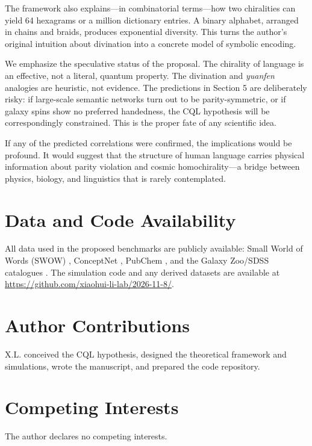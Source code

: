 \documentclass[11pt,a4paper]{article}
\begin{document}
The framework also explains---in combinatorial terms---how two chiralities can yield 64 hexagrams or a million dictionary entries. A binary alphabet, arranged in chains and braids, produces exponential diversity. This turns the author’s original intuition about divination into a concrete model of symbolic encoding.

We emphasize the speculative status of the proposal. The chirality of language is an effective, not a literal, quantum property. The divination and \emph{yuanfen} analogies are heuristic, not evidence. The predictions in Section 5 are deliberately risky: if large-scale semantic networks turn out to be parity-symmetric, or if galaxy spins show no preferred handedness, the CQL hypothesis will be correspondingly constrained. This is the proper fate of any scientific idea.

If any of the predicted correlations were confirmed, the implications would be profound. It would suggest that the structure of human language carries physical information about parity violation and cosmic homochirality---a bridge between physics, biology, and linguistics that is rarely contemplated.

\section*{Data and Code Availability}

All data used in the proposed benchmarks are publicly available: Small World of Words (SWOW) \cite{deyoe19}, ConceptNet \cite{speer17}, PubChem \cite{kim16}, and the Galaxy Zoo/SDSS catalogues \cite{lintott11}. The simulation code and any derived datasets are available at \url{https://github.com/xiaohui-li-lab/2026-11-8/}.

\section*{Author Contributions}

X.L. conceived the CQL hypothesis, designed the theoretical framework and simulations, wrote the manuscript, and prepared the code repository.

\section*{Competing Interests}

The author declares no competing interests.
\end{document}
